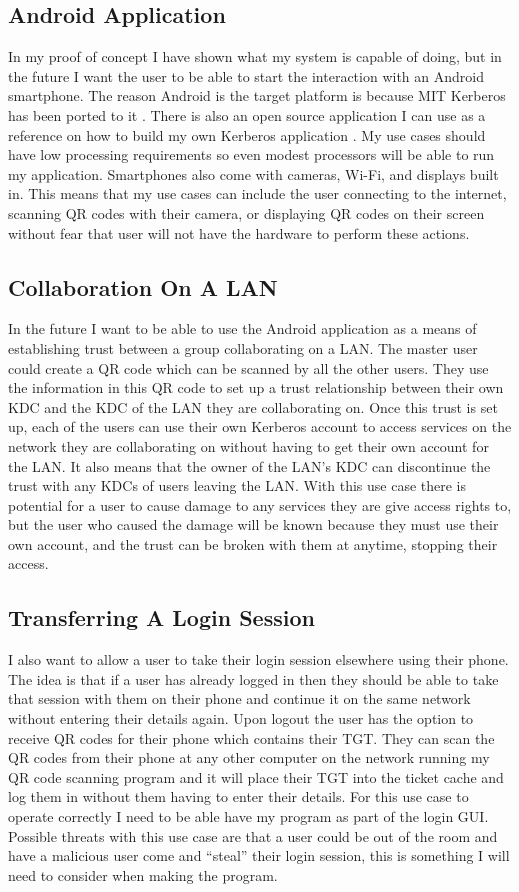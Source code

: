\documentclass[]{report}   %
\begin{document}
\subsection{Android Application}
In my proof of concept I have shown what my system is capable of doing, but in the future I want the user to be able to start the interaction with an Android smartphone. The reason Android is the target platform is because MIT Kerberos has been ported to it \cite{KerbDroid}. There is also an open source application I can use as a reference on how to build my own Kerberos application \cite{KerbApp}. My use cases should have low processing requirements so even modest processors will be able to run my application. Smartphones also come with cameras, Wi-Fi, and displays built in. This means that my use cases can include the user connecting to the internet, scanning QR codes with their camera, or displaying QR codes on their screen without fear that user will not have the hardware to perform these actions.

\subsection{Collaboration On A LAN}
In the future I want to be able to use the Android application as a means of establishing trust between a group collaborating on a LAN. The master user could create a QR code which can be scanned by all the other users. They use the information in this QR code to set up a trust relationship between their own KDC and the KDC of the LAN they are collaborating on. Once this trust is set up, each of the users can use their own Kerberos account to access services on the network they are collaborating on without having to get their own account for the LAN. It also means that the owner of the LAN’s KDC can discontinue the trust with any KDCs of users leaving the LAN. With this use case there is potential for a user to cause damage to any services they are give access rights to, but the user who caused the damage will be known because they must use their own account, and the trust can be broken with them at anytime, stopping their access.

\subsection{Transferring A Login Session}
I also want to allow a user to take their login session elsewhere using their phone. The idea is that if a user has already logged in then they should be able to take that session with them on their phone and continue it on the same network without entering their details again. Upon logout the user has the option to receive QR codes for their phone which contains their TGT. They can scan the QR codes from their phone at any other computer on the network running my QR code scanning program and it will place their TGT into the ticket cache and log them in without them having to enter their details. For this use case to operate correctly I need to be able have my program as part of the login GUI. Possible threats with this use case are that a user could be out of the room and have a malicious user come and “steal” their login session, this is something I will need to consider when making the program.
\end{document}
